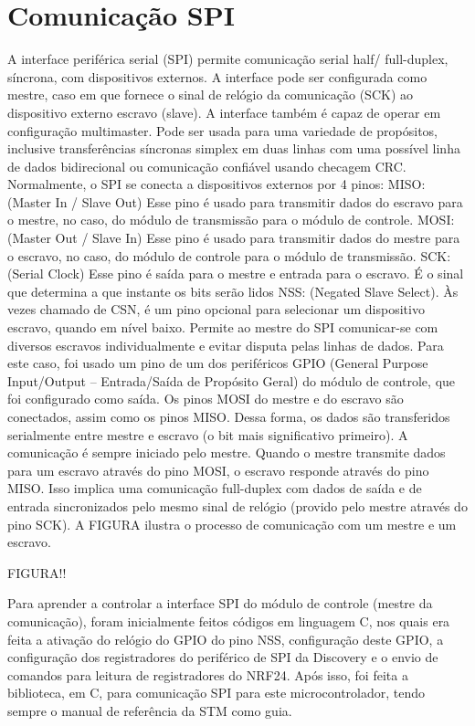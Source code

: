 \chapter{Comunicação SPI}\label{cap:com_spi}

A interface periférica serial (SPI) permite comunicação serial half/ full-duplex, síncrona, com dispositivos externos. A interface pode ser configurada como mestre, caso em que fornece o sinal de relógio da comunicação (SCK) ao dispositivo externo escravo (slave). A 
interface também é capaz de operar em configuração multimaster.
Pode ser usada para uma variedade de propósitos, inclusive transferências síncronas simplex em duas linhas com uma possível linha de dados bidirecional ou comunicação confiável usando checagem CRC.
Normalmente, o SPI se conecta a dispositivos externos por 4 pinos:
MISO: (Master In / Slave Out) Esse pino é usado para transmitir dados do escravo para o mestre, no caso, do módulo de transmissão para o módulo de controle.
 MOSI: (Master Out / Slave In) Esse pino é usado para transmitir dados do mestre para o escravo, no caso, do módulo de controle para o módulo de transmissão.
SCK: (Serial Clock) Esse pino é saída para o mestre e entrada para o escravo. É o sinal que determina a que instante os bits serão lidos
NSS: (Negated Slave Select). Às vezes chamado de CSN, é um pino opcional para selecionar um dispositivo escravo, quando em nível baixo. Permite ao mestre do SPI comunicar-se com diversos escravos individualmente e evitar disputa pelas linhas de dados. Para este caso, foi usado um pino de um dos periféricos GPIO (General Purpose Input/Output – Entrada/Saída de Propósito Geral) do módulo de controle, que foi configurado como saída.
Os pinos MOSI do mestre e do escravo são conectados, assim como os pinos MISO. Dessa forma, os dados são transferidos serialmente entre mestre e escravo (o bit mais significativo primeiro).
A comunicação é sempre iniciado pelo mestre. Quando o mestre transmite dados para um escravo através do pino MOSI, o escravo responde através do pino MISO. Isso implica uma comunicação full-duplex com dados de saída e de entrada sincronizados pelo mesmo sinal de relógio (provido pelo mestre através do pino SCK).
A FIGURA ilustra o processo de comunicação com um mestre e um escravo.

FIGURA!!

Para aprender a controlar a interface SPI do módulo de controle (mestre da comunicação), foram inicialmente feitos códigos em linguagem C, nos quais era feita a ativação do relógio do GPIO do pino NSS, configuração deste GPIO, a configuração dos registradores do periférico de SPI da Discovery e o envio de comandos para leitura de registradores do NRF24.
Após isso, foi feita a biblioteca, em C, para comunicação SPI para este microcontrolador, tendo sempre o manual de referência da STM como guia.


